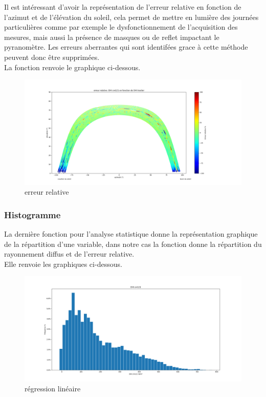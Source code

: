 \documentclass[12pt,a4paper]{article}
\begin{document}
\begin{flushleft}
Il est intéressant d'avoir la représentation de l'erreur relative en fonction de l'azimut et de l'élévation du soleil, cela permet de mettre en lumière des journées particulières comme par exemple le dysfonctionnement de l'acquisition des mesures, mais aussi la présence de masques ou de reflet impactant le pyranomètre. Les erreurs aberrantes qui sont identifées grace à cette méthode peuvent donc être supprimées.\\
La fonction renvoie le graphique ci-dessous.
 
\begin{figure}[H]
\centering
\includegraphics[width=15cm]{image/erreur_relative/1.png} 
\caption{erreur relative}  
\end{figure}

\subsubsection{Histogramme}

La dernière fonction pour l'analyse statistique donne la représentation graphique de la répartition d'une variable, dans notre cas la fonction donne la répartition du rayonnement diffus et de l'erreur relative.\\
Elle renvoie les graphiques ci-dessous.
\begin{figure}[H]
\centering
\includegraphics[width=15cm]{image/histogramme/1.png} 
\caption{régression linéaire}  
\end{figure}


\end{flushleft}
\end{document}
